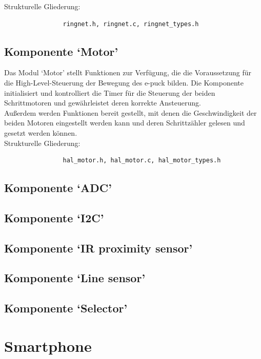 \documentclass[10pt,a4paper]{article}
\let\oldsection\section
\renewcommand{\section}{\newpage \oldsection}
\begin{document}
				Strukturelle Gliederung:
				\begin{verbatim}  
				ringnet.h, ringnet.c, ringnet_types.h
				\end{verbatim}
			
			\subsection{Komponente `Motor'}
			Das Modul `Motor' stellt Funktionen zur Verfügung, die die Voraussetzung für die High-Level-Steuerung der Bewegung des e-puck bilden.
			Die Komponente initialisiert und kontrolliert die Timer für die Steuerung der beiden Schrittmotoren und gewährleistet deren korrekte
			Ansteuerung. \\
			Außerdem werden Funktionen bereit gestellt, mit denen die Geschwindigkeit der beiden Motoren eingestellt werden kann und deren
			Schrittzähler gelesen und gesetzt werden können. \\
			
			Strukturelle Gliederung:
				\begin{verbatim}  
				hal_motor.h, hal_motor.c, hal_motor_types.h
				\end{verbatim}
			
			\subsection{Komponente `ADC'}
			
			\subsection{Komponente `I2C'}
			
			\subsection{Komponente `IR proximity sensor'}
			
			\subsection{Komponente `Line sensor'}
			
			\subsection{Komponente `Selector'}
			
		\section{Smartphone}
\end{document}
